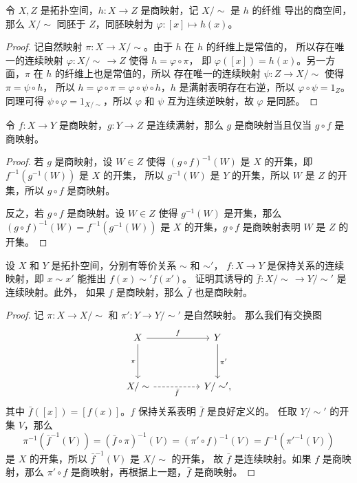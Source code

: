 \documentclass[fontset=none]{Notes}
\begin{document}
\begin{corollary}
  令 $X,Z$ 是拓扑空间，$h:X\to Z$ 是商映射，记 $X/\sim$ 是 $h$ 的纤维
  导出的商空间，那么 $X/\sim$ 同胚于 $Z$，同胚映射为 $\varphi:[x]\mapsto h(x)$。
\end{corollary}
\begin{proof}
  记自然映射 $\pi:X\to X/\sim$。由于 $h$ 在 $h$ 的纤维上是常值的，
  所以存在唯一的连续映射 $\varphi:X/\sim\,\to Z$ 使得 $h=\varphi\circ\pi$，
  即 $\varphi([x])=h(x)$。另一方面，$\pi$ 在 $h$ 的纤维上也是常值的，所以
  存在唯一的连续映射 $\psi:Z\to X/\sim$ 使得 $\pi=\psi\circ h$，
  所以 $h=\varphi\circ\pi=\varphi\circ\psi\circ h$，$h$
  是满射表明存在右逆，所以 $\varphi\circ\psi=1_Z$。
  同理可得 $\psi\circ\varphi=1_{X/\sim}$，所以 $\varphi$
  和 $\psi$ 互为连续逆映射，故 $\varphi$ 是同胚。
\end{proof}

\begin{problem}{}{}
  令 $f:X\to Y$ 是商映射，$g:Y\to Z$ 是连续满射，那么 $g$
  是商映射当且仅当 $g\circ f$ 是商映射。 
\end{problem}
\begin{proof}
  若 $g$ 是商映射，设 $W\in Z$ 使得 $(g\circ f)^{-1}(W)$
  是 $X$ 的开集，即 $f^{-1}(g^{-1}(W))$ 是 $X$ 的开集，
  所以 $g^{-1}(W)$ 是 $Y$ 的开集，所以 $W$ 是 $Z$
  的开集，所以 $g\circ f$ 是商映射。

  反之，若 $g\circ f$ 是商映射。设 $W\in Z$ 使得 $g^{-1}(W)$
  是开集，那么 $(g\circ f)^{-1}(W)=f^{-1}(g^{-1}(W))$
  是 $X$ 的开集，$g\circ f$ 是商映射表明 $W$ 是 $Z$ 的开集。
\end{proof}

\begin{problem}{}{}
  设 $X$ 和 $Y$ 是拓扑空间，分别有等价关系 $\sim$ 和 $\sim'$，
  $f:X\to Y$ 是保持关系的连续映射，即 $x\sim x'$ 能推出 $f(x)\sim' f(x')$。
  证明其诱导的 $\bar f:X/\sim\,\to Y/\sim'$ 是连续映射。此外，
  如果 $f$ 是商映射，那么 $\bar f$ 也是商映射。
\end{problem}
\begin{proof}
  记 $\pi:X\to X/\sim$ 和 $\pi':Y\to Y/\sim'$ 是自然映射。
  那么我们有交换图
  \[
    \begin{tikzcd}[sep=huge]
      X\arrow[r,"f"]\arrow[d,"\pi"'] & Y\arrow[d,"\pi'"]\\
      X/\sim\arrow[r,"\bar f"',dashed] & Y/\sim',
    \end{tikzcd}
  \] 
  其中 $\bar f([x])=[f(x)]$。$f$ 保持关系表明 $\bar f$ 是良好定义的。
  任取 $Y/\sim'$ 的开集 $V$，那么 
  \[
    \pi^{-1}(\bar f^{-1}(V))=(\bar f\circ\pi)^{-1}(V)=(\pi'\circ f)^{-1}(V)=f^{-1}(\pi'^{-1}(V))
  \]
  是 $X$ 的开集，所以 $\bar f^{-1}(V)$ 是 $X/\sim$ 的开集，
  故 $\bar f$ 是连续映射。如果 $f$ 是商映射，那么
  $\pi'\circ f$ 是商映射，再根据上一题，$\bar f$ 是商映射。
\end{proof}
\end{document}
